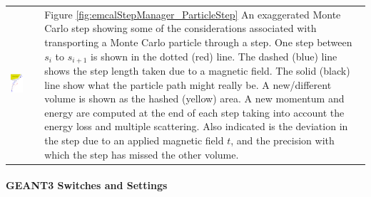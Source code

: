 \begin{tabular*}{\textwidth}[ht]{p{}p{}}
\includegraphics[width=0.5\textwidth]{figures/EMCalMCStep.pdf}
\label{fig:emcalStepManager_ParticleStep}
&
\vspace{-10.5cm}
Figure \ref{fig:emcalStepManager_ParticleStep}
An exaggerated Monte Carlo step showing some of the considerations associated
with transporting a Monte Carlo particle through a step. One step between
$s_{i}$ to $s_{i+1}$ is shown in the dotted (red) line. The dashed (blue)
line shows the step length taken due to a magnetic field. The solid (black)
line show what the particle path might really be. A new/different volume
is shown as the hashed (yellow) area. A new momentum and energy are
computed at the end of each step taking into account the energy loss
and multiple scattering. Also indicated is the deviation in the step
due to an applied magnetic field $t$, and the precision with which
the step has missed the other volume.
\\
\end{tabular*}


\paragraph{GEANT3 Switches and Settings}


